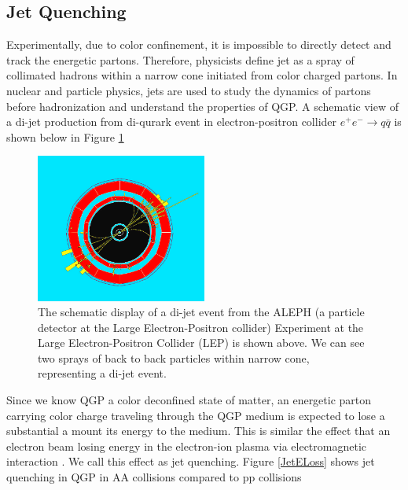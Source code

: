 \subsection{Jet Quenching} 

Experimentally, due to color confinement, it is impossible to directly detect and track the energetic partons. Therefore, physicists define jet as a spray of collimated hadrons within a narrow cone initiated from color charged partons. In nuclear and particle physics, jets are used to study the dynamics of partons before hadronization \cite{HERAJET} and understand the properties of QGP. A schematic view of a di-jet production from di-qurark event in electron-positron collider $e^+e^-\rightarrow q \bar q$ is shown below in Figure \ref{dijet}


\begin{figure}[hbtp]
\begin{center}
\includegraphics[width=0.50\textwidth]{Figures/Chapter1/DijetEvt.png}
\caption{The schematic display of a di-jet event from the ALEPH (a particle detector at the Large Electron-Positron collider) Experiment at the Large Electron-Positron Collider (LEP) is shown above. We can see two sprays of back to back particles within narrow cone, representing a di-jet event.}
\label{dijet}
\end{center}
\end{figure} 


Since we know QGP a color deconfined state of matter, an energetic parton carrying color charge traveling through the QGP medium is expected to lose a substantial a mount its energy to the medium. This is similar the effect that an electron beam losing energy in the electron-ion plasma via electromagnetic interaction \cite{ELossPlasma}. We call this effect as jet quenching. Figure \ref{JetELoss} shows jet quenching in QGP in AA collisions compared to pp collisions

